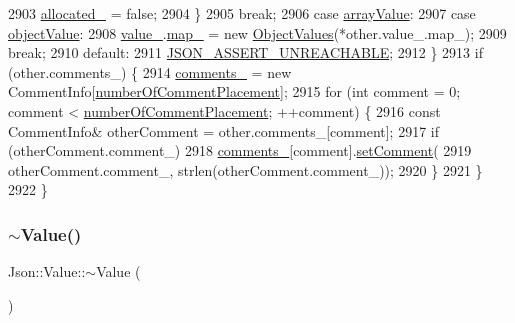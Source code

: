 \begin{DoxyCode}
2903       \hyperlink{class_json_1_1_value_ae0126c80dc4907aad94088553fc7632b}{allocated\_} = \textcolor{keyword}{false};
2904     \}
2905     \textcolor{keywordflow}{break};
2906   \textcolor{keywordflow}{case} \hyperlink{namespace_json_a7d654b75c16a57007925868e38212b4eadc8f264f36b55b063c78126b335415f4}{arrayValue}:
2907   \textcolor{keywordflow}{case} \hyperlink{namespace_json_a7d654b75c16a57007925868e38212b4eae8386dcfc36d1ae897745f7b4f77a1f6}{objectValue}:
2908     \hyperlink{class_json_1_1_value_aef578244546212705b9f81eb84d7e151}{value\_}.\hyperlink{union_json_1_1_value_1_1_value_holder_a1e7a5b86d4f52234f55c847ad1ce389a}{map\_} = \textcolor{keyword}{new} \hyperlink{class_json_1_1_value_a08b6c80c3af7071d908dabf044de5388}{ObjectValues}(*other.value\_.map\_);
2909     \textcolor{keywordflow}{break};
2910   \textcolor{keywordflow}{default}:
2911     \hyperlink{jsoncpp_8cpp_aa5e619e3e9388f6376a344dd8462c9cc}{JSON\_ASSERT\_UNREACHABLE};
2912   \}
2913   \textcolor{keywordflow}{if} (other.comments\_) \{
2914     \hyperlink{class_json_1_1_value_a2016564cabc7a29208e97bd0b782a4e4}{comments\_} = \textcolor{keyword}{new} CommentInfo[\hyperlink{namespace_json_a4fc417c23905b2ae9e2c47d197a45351abcbd3eb00417335e094e4a03379659b5}{numberOfCommentPlacement}];
2915     \textcolor{keywordflow}{for} (\textcolor{keywordtype}{int} comment = 0; comment < \hyperlink{namespace_json_a4fc417c23905b2ae9e2c47d197a45351abcbd3eb00417335e094e4a03379659b5}{numberOfCommentPlacement}; ++comment) \{
2916       \textcolor{keyword}{const} CommentInfo& otherComment = other.comments\_[comment];
2917       \textcolor{keywordflow}{if} (otherComment.comment\_)
2918         \hyperlink{class_json_1_1_value_a2016564cabc7a29208e97bd0b782a4e4}{comments\_}[comment].\hyperlink{struct_json_1_1_value_1_1_comment_info_a4d01c2cd8c07995969c5d636dfd4fa8c}{setComment}(
2919             otherComment.comment\_, strlen(otherComment.comment\_));
2920     \}
2921   \}
2922 \}
\end{DoxyCode}
\mbox{\label{class_json_1_1_value_a287dea48da3912d02756735bf677b27b}} 
\subsubsection{\texorpdfstring{$\sim$\+Value()}{~Value()}}
{\footnotesize\ttfamily Json\+::\+Value\+::$\sim$\+Value (\begin{DoxyParamCaption}{ }\end{DoxyParamCaption})}



